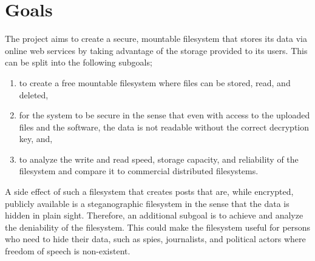 
\section{Goals}


The project aims to create a secure, mountable filesystem that stores its data via online web services by taking advantage of the storage provided to its users. This can be split into the following subgoals;
\begin{enumerate}
\item to create a free mountable filesystem where files can be stored, read, and deleted, %
\item for the system to be secure in the sense that even with access to the uploaded files and the software, the data is not readable without the correct decryption key, and, %
\item to analyze the write and read speed, storage capacity, and reliability of the filesystem and compare it to commercial distributed filesystems.
\end{enumerate}

A side effect of such a filesystem that creates posts that are, while encrypted, publicly available is a steganographic filesystem in the sense that the data is hidden in plain sight. Therefore, an additional subgoal is to achieve and analyze the deniability of the filesystem. This could make the filesystem useful for persons who need to hide their data, such as spies, journalists, and political actors where freedom of speech is non-existent.

